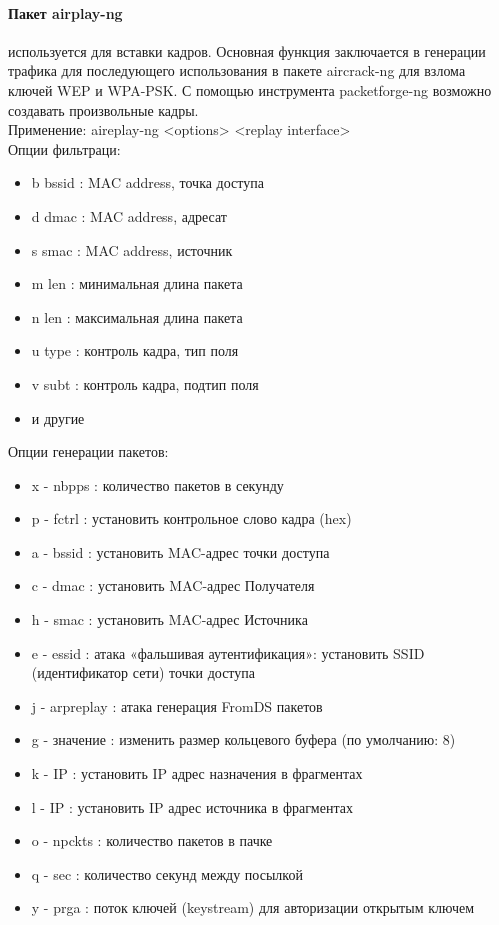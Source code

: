 \documentclass[10pt,a4paper]{report}
\begin{document}
\paragraph{Пакет airplay-ng} используется для вставки кадров. Основная функция заключается в генерации трафика для последующего использования в пакете aircrack-ng для взлома ключей WEP и WPA-PSK. С помощью инструмента packetforge-ng возможно создавать произвольные кадры. \\ Применение:  aireplay-ng <options> <replay interface> \\
Опции фильтраци: \\
\begin{itemize}
\item b bssid : MAC address, точка доступа
\item d dmac : MAC address, адресат
\item s smac : MAC address, источник
\item m len :  минимальная длина пакета
\item n len :  максимальная длина пакета
\item u type : контроль кадра, тип поля
\item v subt : контроль кадра, подтип поля
\item и другие
\end{itemize} 
Опции генерации пакетов: \\
\begin{itemize} 
\item  x - nbpps : количество пакетов в секунду
\item  p - fctrl : установить контрольное слово кадра (hex)
\item  a - bssid : установить MAC-адрес точки доступа
\item  c - dmac : установить MAC-адрес Получателя
\item  h - smac : установить MAC-адрес Источника
\item  e - essid : атака «фальшивая аутентификация»: установить SSID (идентификатор сети) точки доступа
\item  j - arpreplay : атака	генерация FromDS пакетов
\item  g - значение : изменить размер кольцевого буфера (по умолчанию: 8)
\item  k - IP : установить IP адрес назначения в фрагментах
\item  l - IP : установить IP адрес источника в фрагментах
\item  o - npckts : количество пакетов в пачке 
\item  q - sec : количество секунд между посылкой
\item  y - prga : поток ключей (keystream) для авторизации открытым ключем
\end{itemize} 
\end{document}
